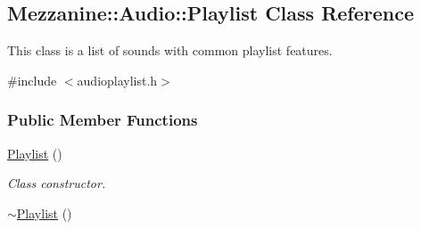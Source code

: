 \hypertarget{classMezzanine_1_1Audio_1_1Playlist}{
\subsection{Mezzanine::Audio::Playlist Class Reference}
\label{classMezzanine_1_1Audio_1_1Playlist}
}


This class is a list of sounds with common playlist features.  




{\ttfamily \#include $<$audioplaylist.h$>$}

\subsubsection*{Public Member Functions}
\begin{DoxyCompactItemize}
\item 
\hypertarget{classMezzanine_1_1Audio_1_1Playlist_a55f449c891d5e9197b8d305309561c75}{
\hyperlink{classMezzanine_1_1Audio_1_1Playlist_a55f449c891d5e9197b8d305309561c75}{Playlist} ()}
\label{classMezzanine_1_1Audio_1_1Playlist_a55f449c891d5e9197b8d305309561c75}

\begin{DoxyCompactList}\small\item\em Class constructor. \item\end{DoxyCompactList}\item 
\hypertarget{classMezzanine_1_1Audio_1_1Playlist_a5b656508026e3d265cd81b9d9f3a1547}{
\hyperlink{classMezzanine_1_1Audio_1_1Playlist_a5b656508026e3d265cd81b9d9f3a1547}{$\sim$Playlist} ()}
\label{classMezzanine_1_1Audio_1_1Playlist_a5b656508026e3d265cd81b9d9f3a1547}


\end{DoxyCompactItemize}
